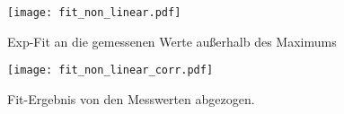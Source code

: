 \begin{figure}
  \centering
  \texttt{[image: fit\_non\_linear.pdf]}
  \caption{Exp-Fit an die gemessenen Werte außerhalb des Maximums}
  \label{fig:fit_non_linear}
\end{figure}

\begin{figure}
  \centering
  \texttt{[image: fit\_non\_linear\_corr.pdf]}
  \caption{Fit-Ergebnis von den Messwerten abgezogen.}
  \label{fig:fit_non_linear_corr}
\end{figure}
